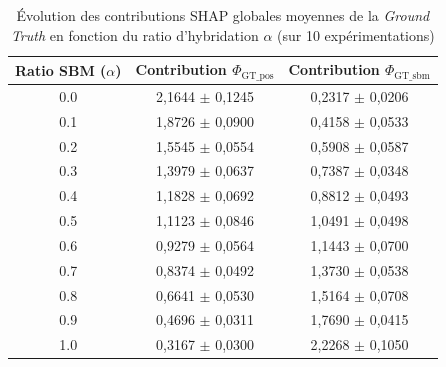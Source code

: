 \begin{table}[!ht]
\centering
\caption{Évolution des contributions SHAP globales moyennes de la \textit{Ground Truth} en fonction du ratio d'hybridation $\alpha$ (sur 10 expérimentations)}
\label{tab:validation_gt_shap}
\begin{tabular}{ccc}
\hline
\textbf{Ratio SBM ($\alpha$)} & \textbf{Contribution $\Phi_{\text{GT\_pos}}$} & \textbf{Contribution $\Phi_{\text{GT\_sbm}}$} \\
\hline
0.0 & 2,1644 $\pm$ 0,1245 & 0,2317 $\pm$ 0,0206 \\
0.1 & 1,8726 $\pm$ 0,0900 & 0,4158 $\pm$ 0,0533 \\
0.2 & 1,5545 $\pm$ 0,0554 & 0,5908 $\pm$ 0,0587 \\
0.3 & 1,3979 $\pm$ 0,0637 & 0,7387 $\pm$ 0,0348 \\
0.4 & 1,1828 $\pm$ 0,0692 & 0,8812 $\pm$ 0,0493 \\
0.5 & 1,1123 $\pm$ 0,0846 & 1,0491 $\pm$ 0,0498 \\
0.6 & 0,9279 $\pm$ 0,0564 & 1,1443 $\pm$ 0,0700 \\
0.7 & 0,8374 $\pm$ 0,0492 & 1,3730 $\pm$ 0,0538 \\
0.8 & 0,6641 $\pm$ 0,0530 & 1,5164 $\pm$ 0,0708 \\
0.9 & 0,4696 $\pm$ 0,0311 & 1,7690 $\pm$ 0,0415 \\
1.0 & 0,3167 $\pm$ 0,0300 & 2,2268 $\pm$ 0,1050 \\
\hline
\end{tabular}
\end{table}